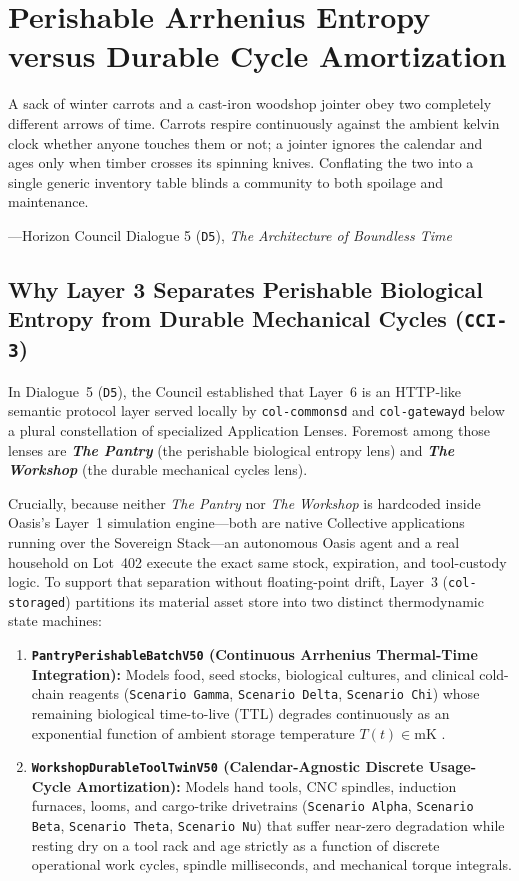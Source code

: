 \chapter{Perishable Arrhenius Entropy versus Durable Cycle Amortization}
\label{ch:perishable-vs-durable}

\epigraph{A sack of winter carrots and a cast-iron woodshop jointer obey two completely different arrows of time. Carrots respire continuously against the ambient kelvin clock whether anyone touches them or not; a jointer ignores the calendar and ages only when timber crosses its spinning knives. Conflating the two into a single generic inventory table blinds a community to both spoilage and maintenance.}{---Horizon Council Dialogue 5 (\texttt{D5}), \textit{The Architecture of Boundless Time}}

\section{Why Layer 3 Separates Perishable Biological Entropy from Durable Mechanical Cycles (\texttt{CCI-3})}
\label{sec:ch7-thermodynamic-split}

In Dialogue~5 (\texttt{D5}), the Council established that Layer~6 is an HTTP-like semantic protocol layer served locally by \texttt{col-commonsd} and \texttt{col-gatewayd} below a plural constellation of specialized Application Lenses. Foremost among those lenses are \textbf{\textit{The Pantry}} (the perishable biological entropy lens) and \textbf{\textit{The Workshop}} (the durable mechanical cycles lens).

Crucially, because neither \textit{The Pantry} nor \textit{The Workshop} is hardcoded inside Oasis's Layer~1 simulation engine---both are native Collective applications running over the Sovereign Stack---an autonomous Oasis agent and a real household on Lot~402 execute the exact same stock, expiration, and tool-custody logic. To support that separation without floating-point drift, Layer~3 (\texttt{col-storaged}) partitions its material asset store into two distinct thermodynamic state machines:
\begin{enumerate}
    \item \textbf{\texttt{PantryPerishableBatchV50} (Continuous Arrhenius Thermal-Time Integration):} Models food, seed stocks, biological cultures, and clinical cold-chain reagents (\texttt{Scenario Gamma}, \texttt{Scenario Delta}, \texttt{Scenario Chi}) whose remaining biological time-to-live (TTL) degrades continuously as an exponential function of ambient storage temperature $T(t) \in \mathrm{mK}$ \parencite{arrhenius1889}.
    \item \textbf{\texttt{WorkshopDurableToolTwinV50} (Calendar-Agnostic Discrete Usage-Cycle Amortization):} Models hand tools, CNC spindles, induction furnaces, looms, and cargo-trike drivetrains (\texttt{Scenario Alpha}, \texttt{Scenario Beta}, \texttt{Scenario Theta}, \texttt{Scenario Nu}) that suffer near-zero degradation while resting dry on a tool rack and age strictly as a function of discrete operational work cycles, spindle milliseconds, and mechanical torque integrals.
\end{enumerate}

